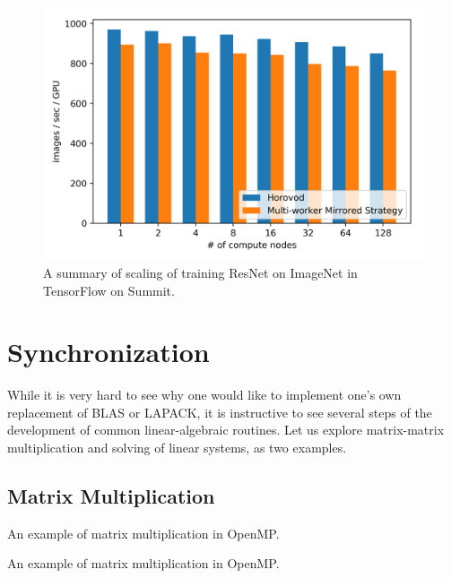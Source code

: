 \begin{figure}[t!]
    \includegraphics[width=\textwidth]{./static/summit-tensorflow-performance2.png}
    \caption{A summary of scaling of training ResNet on ImageNet in TensorFlow on Summit.}
    \label{fig:summit-tensorflow-performance2}
    \end{figure}

\section{Synchronization}

While it is very hard to see why one would like to 
implement one's own replacement of BLAS or LAPACK, it is
instructive to see several steps of the development
of common linear-algebraic routines. 
Let us explore matrix-matrix multiplication and 
solving of linear systems, as two examples. 

\subsection{Matrix Multiplication}


\begin{codebox}[breakable]{}
\footnotesize An example of matrix multiplication in OpenMP.
\tcblower
{}
\end{codebox}

\begin{codebox}[breakable]{}
\footnotesize An example of matrix multiplication in OpenMP.
\tcblower
{}
\end{codebox}

